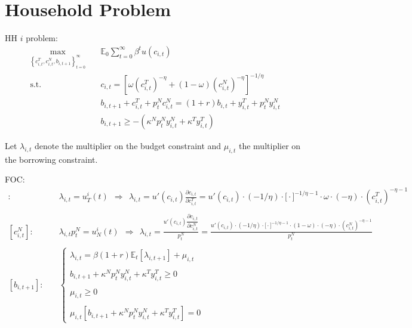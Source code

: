 \documentclass[11pt]{article}
\newcommand{\R}{\Rightarrow}
\begin{document}
\section{Household Problem}

HH $i$ problem:
\begin{align*}
    \max_{\left\{
c_{i,t}^{T},
c_{i,t}^{N},
b_{i,t+1}
\right\}_{t=0}^\infty} \quad & \mathbb{E}_0
\sum_{t=0}^{\infty}
\beta^t u(c_{i,t}) \\ 
\text{s.t.} \quad &  c_{i,t}
=
\left[
\omega (c_{i,t}^{T})^{-\eta}
+
(1-\omega)(c_{i,t}^{N})^{-\eta}
\right]^{-1/\eta}  \\
& b_{i,t+1} +c_{i,t}^{T}+p_t^N c_{i,t}^{N}=(1+r)b_{i,t}+y_{i,t}^{T}+p_t^N y_{i,t}^{N} \\ 
& b_{i,t+1}
\geq
-
\left(
\kappa^N p_t^N y_{i,t}^{N}
+
\kappa^T y_{i,t}^{T}
\right)
\end{align*}

Let $\lambda_{i,t}$ denote the multiplier on the budget constraint and
$\mu_{i,t}$ the multiplier on the borrowing constraint.

FOC:
\begin{align*}
    [c_{i,t}^T]: \quad &  \lambda_{i,t} = u_{T}^i(t) \ \ \R \ \ \lambda_{i,t}
=
u'(c_{i,t})
\frac{\partial c_{i,t}}{\partial c_{i,t}^{T}} = u'(c_{i,t}) \cdot (-1/\eta) \cdot \Big[ \cdot\Big]^{-1/\eta-1}\cdot \omega \cdot (-\eta) \cdot (c_{i,t}^{T})^{-\eta-1}
\\  \\ 
  [c_{i,t}^N]: \quad &  \lambda_{i,t}p_t^N = u_{N}^i(t) \ \ \R \ \ \lambda_{i,t}
=\frac{u'(c_{i,t})
\dfrac{\partial c_{i,t}}{\partial c_{i,t}^{N}}}{p_t^N} 
= \frac{u'(c_{i,t}) \cdot (-1/\eta) \cdot \Big[ \cdot\Big]^{-1/\eta-1}\cdot (1-\omega) \cdot (-\eta) \cdot (c_{i,t}^{N})^{-\eta-1}}{p_t^N}  \\  \\ 
[b_{i,t+1}]: \quad & \left\{\begin{array}{lcc}
\lambda_{i,t}=\beta(1+r)\mathbb{E}_t\left[
\lambda_{i,t+1}\right]+\mu_{i,t} \\  \\ 
b_{i,t+1} + \kappa^N p_t^N y_{i,t}^{N} +\kappa^T y_{i,t}^{T}\geq 0 \\  \\ 
\mu_{i,t}\geq 0 \\  \\ 
\mu_{i,t} \left[b_{i,t+1}+\kappa^N p_t^N y_{i,t}^{N}+\kappa^T y_{i,t}^{T}\right]=0    
\end{array}\right.
\end{align*}
\end{document}
